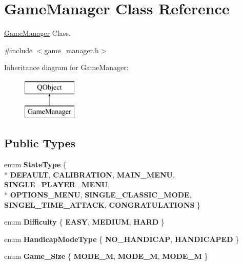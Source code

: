 \hypertarget{class_game_manager}{\section{Game\-Manager Class Reference}
\label{class_game_manager}
}


\hyperlink{class_game_manager}{Game\-Manager} Class.  




{\ttfamily \#include $<$game\-\_\-manager.\-h$>$}

Inheritance diagram for Game\-Manager\-:\begin{figure}[H]
\begin{center}
\leavevmode
\includegraphics[height=2.000000cm]{class_game_manager}
\end{center}
\end{figure}
\subsection*{Public Types}
\begin{DoxyCompactItemize}
\item 
enum {\bfseries State\-Type} \{ \\*
{\bfseries D\-E\-F\-A\-U\-L\-T}, 
{\bfseries C\-A\-L\-I\-B\-R\-A\-T\-I\-O\-N}, 
{\bfseries M\-A\-I\-N\-\_\-\-M\-E\-N\-U}, 
{\bfseries S\-I\-N\-G\-L\-E\-\_\-\-P\-L\-A\-Y\-E\-R\-\_\-\-M\-E\-N\-U}, 
\\*
{\bfseries O\-P\-T\-I\-O\-N\-S\-\_\-\-M\-E\-N\-U}, 
{\bfseries S\-I\-N\-G\-L\-E\-\_\-\-C\-L\-A\-S\-S\-I\-C\-\_\-\-M\-O\-D\-E}, 
{\bfseries S\-I\-N\-G\-E\-L\-\_\-\-T\-I\-M\-E\-\_\-\-A\-T\-T\-A\-C\-K}, 
{\bfseries C\-O\-N\-G\-R\-A\-T\-U\-L\-A\-T\-I\-O\-N\-S}
 \}
\item 
enum {\bfseries Difficulty} \{ {\bfseries E\-A\-S\-Y}, 
{\bfseries M\-E\-D\-I\-U\-M}, 
{\bfseries H\-A\-R\-D}
 \}
\item 
enum {\bfseries Handicap\-Mode\-Type} \{ {\bfseries N\-O\-\_\-\-H\-A\-N\-D\-I\-C\-A\-P}, 
{\bfseries H\-A\-N\-D\-I\-C\-A\-P\-E\-D}
 \}
\item 
enum {\bfseries Game\-\_\-\-Size} \{ {\bfseries M\-O\-D\-E\-\_\-M}, 
{\bfseries M\-O\-D\-E\-\_\-M}, 
{\bfseries M\-O\-D\-E\-\_\-M}
 \}
\end{DoxyCompactItemize}
